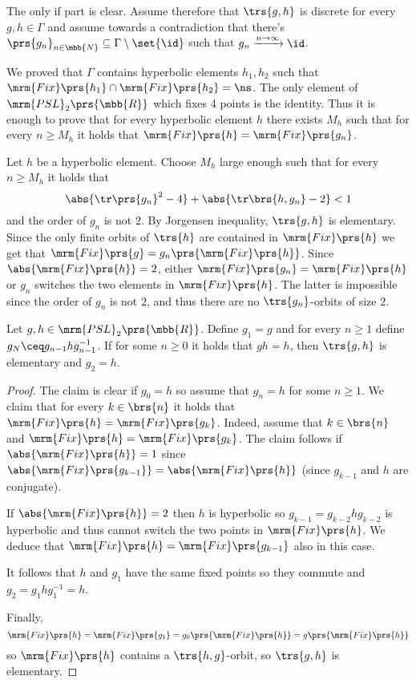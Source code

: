\documentclass[10pt, twoside]{book}
\begin{document}
\begin{theorem}
The only if part is clear. Assume therefore that $\trs{g,h}$ is discrete for every $g,h \in \Gamma$ and assume towards a contradiction that there's $\prs{g_n}_{n \in \mbb{N}} \subseteq \Gamma \setminus \set{\id}$ such that $g_n \xrightarrow{n\to\infty} \id$.

We proved that $\Gamma$ contains hyperbolic elements $h_1, h_2$ such that $\mrm{Fix}\prs{h_1} \cap \mrm{Fix}\prs{h_2} = \ns$.  The only element of $\mrm{PSL}_2\prs{\mbb{R}}$ which fixes $4$ points is the identity. Thus it is enough to prove that for every hyperbolic element $h$ there exists $M_h$ such that for every $n \geq M_h$ it holds that $\mrm{Fix}\prs{h} = \mrm{Fix}\prs{g_n}$.

Let $h$ be a hyperbolic element. Choose $M_h$ large enough such that for every $n \geq M_h$ it holds that
\[\abs{\tr\prs{g_n}^2 - 4} + \abs{\tr\brs{h,g_n} - 2} < 1\]
and the order of $g_n$ is not $2$.
By Jorgensen inequality, $\trs{g,h}$ is elementary. Since the only finite orbits of $\trs{h}$ are contained in $\mrm{Fix}\prs{h}$ we get that $\mrm{Fix}\prs{g} = g_n \prs{\mrm{Fix}\prs{h}}$. Since $\abs{\mrm{Fix}\prs{h}} = 2$, either $\mrm{Fix}\prs{g_n} = \mrm{Fix}\prs{h}$ or $g_n$ switches the two elements in $\mrm{Fix}\prs{h}$. The latter is impossible since the order of $g_n$ is not $2$, and thus there are no $\trs{g_n}$-orbits of size $2$.
\end{theorem}

\begin{lemma}\label{lemma:Jorgensen:lemma_1}
Let $g,h \in \mrm{PSL}_2\prs{\mbb{R}}$. Define $g_1 = g$ and for every $n \geq 1$ define $g_N \ceq g_{n-1} h g_{n-1}^{-1}$. If for some $n \geq 0$ it holds that $gh = h$, then $\trs{g,h}$ is elementary and $g_2 = h$.
\end{lemma}

\begin{proof}
The claim is clear if $g_0 = h$ so assume that $g_n = h$ for some $n \geq 1$. We claim that for every $k \in \brs{n}$ it holds that $\mrm{Fix}\prs{h} = \mrm{Fix}\prs{g_k}$. Indeed, assume that $k \in \brs{n}$ and $\mrm{Fix}\prs{h} = \mrm{Fix}\prs{g_k}$. The claim follows if $\abs{\mrm{Fix}\prs{h}} = 1$ since $\abs{\mrm{Fix}\prs{g_{k-1}}} = \abs{\mrm{Fix}\prs{h}}$ (since $g_{k-1}$ and $h$ are conjugate).

If $\abs{\mrm{Fix}\prs{h}} = 2$ then $h$ is hyperbolic so $g_{k-1} = g_{k-2} h g_{k-2}$ is hyperbolic and thus cannot switch the two points in $\mrm{Fix}\prs{h}$. We deduce that $\mrm{Fix}\prs{h} = \mrm{Fix}\prs{g_{k-1}}$ also in this case.

It follows that $h$ and $g_1$ have the same fixed points so they commute and $g_2 = g_1 h g_1^{-1} = h$.

Finally, \[\mrm{Fix}\prs{h} = \mrm{Fix}\prs{g_1} = g_0\prs{\mrm{Fix}\prs{h}} = g \prs{\mrm{Fix}\prs{h}}\]
so $\mrm{Fix}\prs{h}$ contains a $\trs{h,g}$-orbit, so $\trs{g,h}$ is elementary.
\end{proof}
\end{document}
